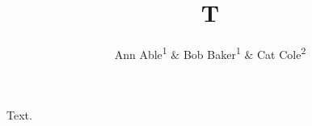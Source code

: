 \documentclass{amsart}
\begin{document}
\title{T}
\author{Ann Able\textsuperscript{1} $\&$ Bob Baker\textsuperscript{1} $\&$ Cat Cole\textsuperscript{2}}
\address{$1.$ Univ X}
\address{$2.$ Univ Y}
\maketitle
Text.
\end{document}
